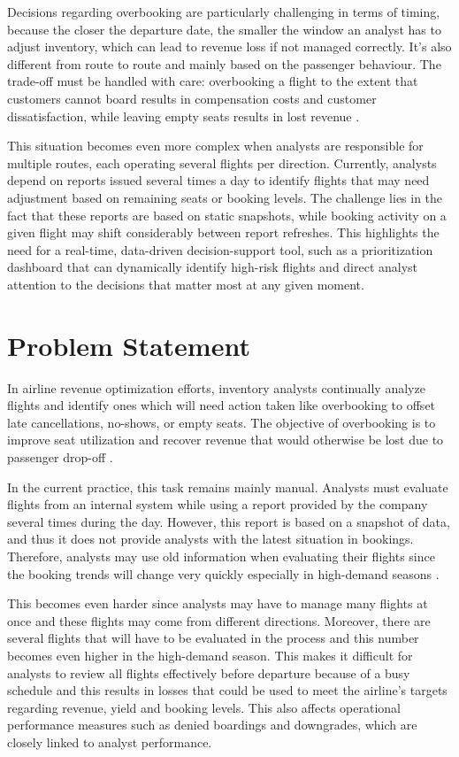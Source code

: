 Decisions regarding overbooking are particularly challenging in terms of timing, because the closer the departure date, the smaller the window an analyst has to adjust inventory, which can lead to revenue loss if not managed correctly. It's also different from route to route and mainly based on the passenger behaviour. The trade-off must be handled with care: overbooking a flight to the extent that customers cannot board results in compensation costs and customer dissatisfaction, while leaving empty seats results in lost revenue \citep{BodilyWeatherford1995}.

This situation becomes even more complex when analysts are responsible for multiple routes, each operating several flights per direction. Currently, analysts depend on reports issued several times a day to identify flights that may need adjustment based on remaining seats or booking levels. The challenge lies in the fact that these reports are based on static snapshots, while booking activity on a given flight may shift considerably between report refreshes. This highlights the need for a real-time, data-driven decision-support tool, such as a prioritization dashboard that can dynamically identify high-risk flights and direct analyst attention to the decisions that matter most at any given moment.

\section{Problem Statement}
\label{sec:problem}

In airline revenue optimization efforts, inventory analysts continually analyze flights and identify ones which will need action taken like overbooking to offset late cancellations, no-shows, or empty seats. The objective of overbooking is to improve seat utilization and recover revenue that would otherwise be lost due to passenger drop-off \citep{Chatwin1999}.

In the current practice, this task remains mainly manual. Analysts must evaluate flights from an internal system while using a report provided by the company several times during the day. However, this report is based on a snapshot of data, and thus it does not provide analysts with the latest situation in bookings. Therefore, analysts may use old information when evaluating their flights since the booking trends will change very quickly especially in high-demand seasons \citep{YigitbasiogluVelcu2012, Rouhani2016}.

This becomes even harder since analysts may have to manage many flights at once and these flights may come from different directions. Moreover, there are several flights that will have to be evaluated in the process and this number becomes even higher in the high-demand season. This makes it difficult for analysts to review all flights effectively before departure because of a busy schedule and this results in losses that could be used to meet the airline's targets regarding revenue, yield and booking levels. This also affects operational performance measures such as denied boardings and downgrades, which are closely linked to analyst performance.

